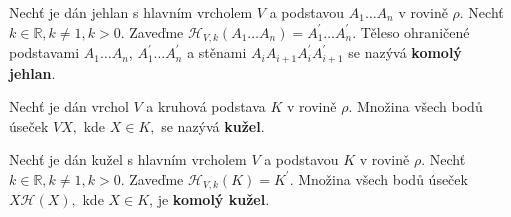 \begin{definition}
    Nechť je dán jehlan s hlavním vrcholem $V$ a podstavou $A_1\dots A_n$ v rovině
    $\rho.$ Nechť $k \in \mathbb R, k \ne 1, k >0.$ Zaveďme $\mathscr H_{V,k}(A_1\dots A_n)
    =A_1^\prime\dots A_n^\prime.$ Těleso ohraničené podstavami $A_1\dots A_n$,
    $A_1^\prime\dots A_n^\prime$ a stěnami $A_iA_{i+1}A_i^\prime A_{i+1}^\prime$ se
    nazývá \textbf{komolý jehlan}.
\end{definition}

\begin{definition}
    Nechť je dán vrchol $V$ a kruhová podstava $K$ v rovině
    $\rho.$ Množina všech bodů úseček $VX,$ kde $X\in K,$ se nazývá \textbf{kužel}.
\end{definition}

\begin{definition}
Nechť je dán kužel s hlavním vrcholem $V$ a podstavou $K$ v rovině
$\rho.$ Nechť $k \in \mathbb R, k \ne 1, k >0.$ Zaveďme $\mathscr H_{V,k}(K)
=K^\prime.$ Množina všech bodů úseček $X\mathscr H(X),$ kde $X\in K$, je
\textbf{komolý kužel}.
\end{definition}

